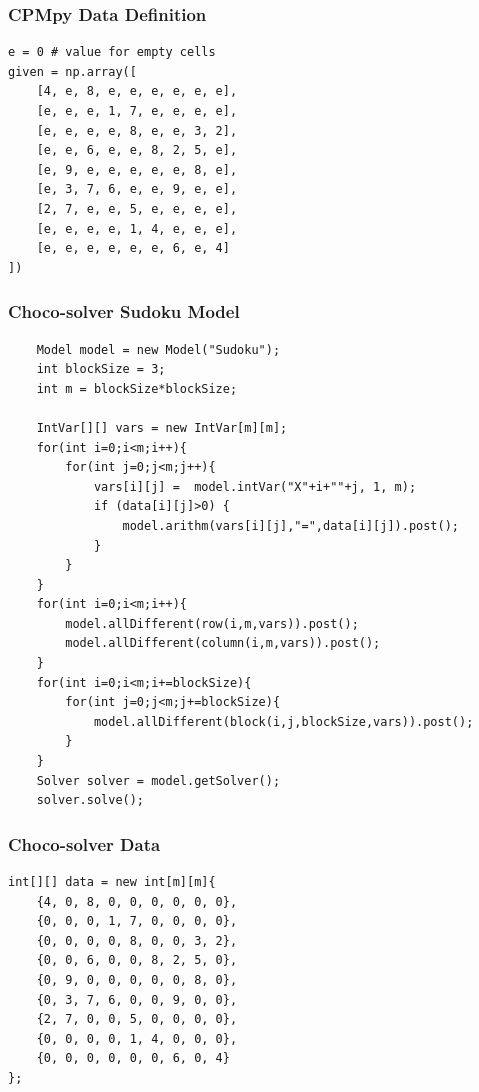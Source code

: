 \begin{frame}[fragile]
\frametitle{CPMpy Data Definition}
\tiny
\begin{verbatim}
e = 0 # value for empty cells
given = np.array([
    [4, e, 8, e, e, e, e, e, e],
    [e, e, e, 1, 7, e, e, e, e],
    [e, e, e, e, 8, e, e, 3, 2],
    [e, e, 6, e, e, 8, 2, 5, e],
    [e, 9, e, e, e, e, e, 8, e],
    [e, 3, 7, 6, e, e, 9, e, e],
    [2, 7, e, e, 5, e, e, e, e],
    [e, e, e, e, 1, 4, e, e, e],
    [e, e, e, e, e, e, 6, e, 4]
])
\end{verbatim}
\hyperlink{sudoku:continue}{}
\end{frame}

\begin{frame}[fragile]
\frametitle{Choco-solver Sudoku Model}
\label{sudoku:choco}
\tiny
\begin{verbatim}
    Model model = new Model("Sudoku");
    int blockSize = 3;
    int m = blockSize*blockSize;

    IntVar[][] vars = new IntVar[m][m];
    for(int i=0;i<m;i++){
        for(int j=0;j<m;j++){
            vars[i][j] =  model.intVar("X"+i+""+j, 1, m);
            if (data[i][j]>0) {
                model.arithm(vars[i][j],"=",data[i][j]).post();
            }
        }
    }
    for(int i=0;i<m;i++){
        model.allDifferent(row(i,m,vars)).post();
        model.allDifferent(column(i,m,vars)).post();
    }
    for(int i=0;i<m;i+=blockSize){
        for(int j=0;j<m;j+=blockSize){
            model.allDifferent(block(i,j,blockSize,vars)).post();
        }
    }
    Solver solver = model.getSolver();
    solver.solve();
\end{verbatim}
\end{frame}

\begin{frame}[fragile]
\frametitle{Choco-solver Data}
\tiny
\begin{verbatim}
int[][] data = new int[m][m]{
    {4, 0, 8, 0, 0, 0, 0, 0, 0},
    {0, 0, 0, 1, 7, 0, 0, 0, 0},
    {0, 0, 0, 0, 8, 0, 0, 3, 2},
    {0, 0, 6, 0, 0, 8, 2, 5, 0},
    {0, 9, 0, 0, 0, 0, 0, 8, 0},
    {0, 3, 7, 6, 0, 0, 9, 0, 0},
    {2, 7, 0, 0, 5, 0, 0, 0, 0},
    {0, 0, 0, 0, 1, 4, 0, 0, 0},
    {0, 0, 0, 0, 0, 0, 6, 0, 4}
};
\end{verbatim}
\end{frame}

